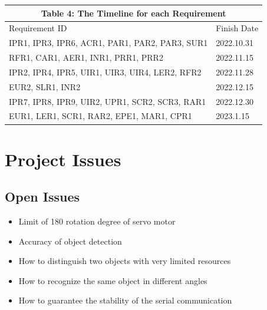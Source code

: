 \documentclass[12pt]{article}
\begin{document}
\begin{tabular}{|p{}|p{}|}

\hline \multicolumn{2}{|c|}{Table 4: The Timeline for each Requirement}\\

\hline Requirement ID&Finish Date\\


\hline IPR1, IPR3, IPR6, ACR1, PAR1, PAR2, PAR3, SUR1&2022.10.31\\

\hline RFR1, CAR1, AER1, INR1, PRR1, PRR2&2022.11.15\\

\hline IPR2, IPR4, IPR5, UIR1, UIR3, UIR4, LER2, RFR2&2022.11.28\\

\hline EUR2, SLR1, INR2&2022.12.15\\

\hline IPR7, IPR8, IPR9, UIR2, UPR1, SCR2, SCR3, RAR1&2022.12.30\\

\hline EUR1, LER1, SCR1, RAR2, EPE1, MAR1, CPR1&2023.1.15\\

\hline

\end{tabular}


\section{Project Issues}

\subsection{Open Issues}

\begin{itemize}
    \item Limit of 180 rotation degree of servo motor
    \item Accuracy of object detection 
    \item How to distinguish two objects with very limited resources
    \item How to recognize the same object in different angles
    \item How to guarantee the stability of the serial communication
\end{itemize}
\end{document}
